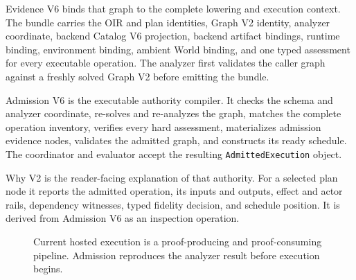 \documentclass[11pt,oneside]{article}
\begin{document}
Evidence V6 binds that graph to the complete lowering and execution context.
The bundle carries the OIR and plan identities, Graph V2 identity, analyzer
coordinate, backend Catalog V6 projection, backend artifact bindings, runtime
binding, environment binding, ambient World binding, and one typed assessment
for every executable operation. The analyzer first validates the caller graph
against a freshly solved Graph V2 before emitting the bundle.

Admission V6 is the executable authority compiler. It checks the schema and
analyzer coordinate, re-solves and re-analyzes the graph, matches the complete
operation inventory, verifies every hard assessment, materializes admission
evidence nodes, validates the admitted graph, and constructs its ready
schedule. The coordinator and evaluator accept the resulting
\texttt{AdmittedExecution} object.

Why V2 is the reader-facing explanation of that authority. For a selected plan
node it reports the admitted operation, its inputs and outputs, effect and
actor rails, dependency witnesses, typed fidelity decision, and schedule
position. It is derived from Admission V6 as an inspection operation.

\begin{figure}[htbp]
\centering
{}
\caption{Current hosted execution is a proof-producing and proof-consuming
pipeline. Admission reproduces the analyzer result before execution begins.}
\label{fig:v6-pipeline}
\end{figure}
\end{document}
